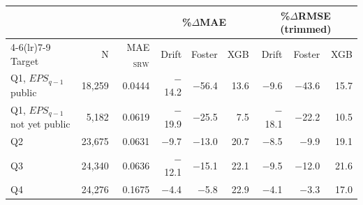\begin{tabular}{lrr rrr rrr}
\toprule
& & & \multicolumn{3}{c}{\%$\Delta$MAE} & \multicolumn{3}{c}{\%$\Delta$RMSE (trimmed)} \\
\cmidrule(lr){4-6}\cmidrule(lr){7-9}
Target & N & MAE$_{\text{SRW}}$ & Drift & Foster & XGB & Drift & Foster & XGB \\
\midrule
Q1, $EPS_{q-1}$ public & 18,259 & 0.0444 & $-$14.2 & $-$56.4 & 13.6 & $-$9.6 & $-$43.6 & 15.7 \\
Q1, $EPS_{q-1}$ not yet public & 5,182 & 0.0619 & $-$19.9 & $-$25.5 & 7.5 & $-$18.1 & $-$22.2 & 10.5 \\
Q2 & 23,675 & 0.0631 & $-$9.7 & $-$13.0 & 20.7 & $-$8.5 & $-$9.9 & 19.1 \\
Q3 & 24,340 & 0.0636 & $-$12.1 & $-$15.1 & 22.1 & $-$9.5 & $-$12.0 & 21.6 \\
Q4 & 24,276 & 0.1675 & $-$4.4 & $-$5.8 & 22.9 & $-$4.1 & $-$3.3 & 17.0 \\
\bottomrule
\end{tabular}
